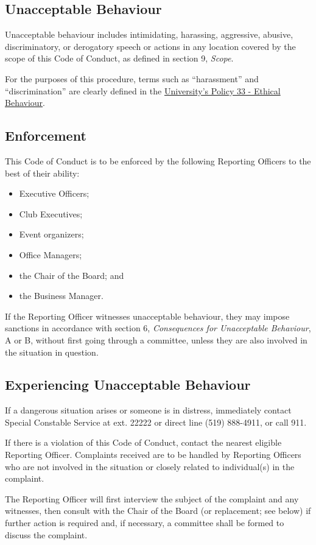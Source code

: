 \subsection{Unacceptable Behaviour}
Unacceptable behaviour includes intimidating, harassing, aggressive, abusive, discriminatory, or derogatory speech or actions in any location covered by the scope of this Code of Conduct, as defined in section 9, \textit{Scope}.

For the purposes of this procedure, terms such as ``harassment'' and ``discrimination'' are clearly defined in the \href{https://uwaterloo.ca/secretariat/policies-procedures-guidelines/policy-33}{University's Policy 33 - Ethical Behaviour}.

\subsection{Enforcement}
This Code of Conduct is to be enforced by the following Reporting Officers to the best of their ability:
\begin{itemize}
	\item Executive Officers;
	\item Club Executives;
	\item Event organizers; 
	\item Office Managers;
	\item the Chair of the Board; and
	\item the Business Manager.
\end{itemize}
If the Reporting Officer witnesses unacceptable behaviour, they may impose sanctions in accordance with section 6, \textit{Consequences for Unacceptable Behaviour}, A or B, without first going through a committee, unless they are also involved in the situation in question.

\subsection{Experiencing Unacceptable Behaviour}
If a dangerous situation arises or someone is in distress, immediately contact Special Constable Service at ext. 22222 or direct line (519) 888-4911, or call 911.

If there is a violation of this Code of Conduct, contact the nearest eligible Reporting Officer. Complaints received are to be handled by Reporting Officers who are not involved in the situation or closely related to individual(s) in the complaint.

The Reporting Officer will first interview the subject of the complaint and any witnesses, then consult with the Chair of the Board (or replacement; see below) if further action is required and, if necessary, a committee shall be formed to discuss the complaint. 

